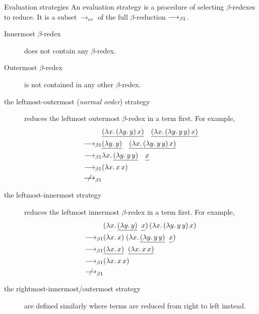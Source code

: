 \begin{frame}[allowframebreaks]{Evaluation strategies}
An evaluation strategy is a procedure of selecting $\beta$-redexes
to reduce. It is a subset $\longrightarrow_{\mathrm{ev}}$ of the full
$\beta$-reduction $\longrightarrow_{\beta1}$.

\begin{description}
  \item[Innermost $\beta$-redex] does not contain any $\beta$-redex.
  \item[Outermost $\beta$-redex] is not contained in any other $\beta$-redex.
\end{description}

\begin{description}
  \item[the leftmost-outermost (\emph{normal order}) strategy] reduces the leftmost outermost
    $\beta$-redex in a term first. For example, 
    \begin{align*}
      & 
      \underline{(\lambda x.\, (\lambda y.\, y)\,x)}\quad
      \underline{(\lambda x.\, (\lambda y.\, y\,y)\,x)}
      \\
      \onereduce &
      \underline{(\lambda y.\, y)}\quad
      \underline{(\lambda x.\, (\lambda y.\, y\,y)\, x)} \\
      \onereduce &
      \lambda x.\, \underline{(\lambda y.\, y\,y)}\quad
      \underline{\vphantom{(\lambda}x} \\
      \onereduce & (\lambda x.\, x\,x) \\
      \notonereduce
    \end{align*}
  \item[the leftmost-innermost strategy] reduces the leftmost innermost
    $\beta$-redex in a term first. For example, 
    \begin{align*}
      & (\lambda x.\, \underline{(\lambda y.\,
        y)}\;\;\underline{\vphantom{(\lambda} x})\,
      (\lambda x.\, (\lambda y.\, y\, y)\,x) \\
      \onereduce & (\lambda x.\,x)\;
      (\lambda x.\, \underline{(\lambda y.\, y\,
        y)}\;\;\underline{\vphantom{(\lambda}x}) \\
      \onereduce & \underline{(\lambda x.\,x)}\;\;\underline{(\lambda x.\, x\,x)} \\
      \onereduce & (\lambda x.\, x\, x) \\
      \notonereduce
    \end{align*}
  \item[the rightmost-innermost/outermost strategy]
    are defined similarly where terms are reduced from right to left
    instead.
\end{description}
\end{frame}

